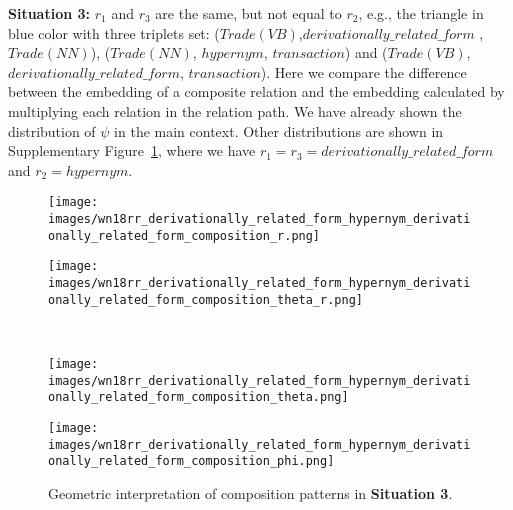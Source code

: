 \documentclass[11pt]{article}
\begin{document}
\textbf{Situation 3:} \(r_1\) and \(r_3\) are the same, but not equal to \(r_2\), e.g., the triangle in blue color with three triplets set: (\(Trade(VB)\),\(derivationally\_related\_form\)
, \(Trade(NN)\)), (\(Trade(NN)\), \(hypernym\), \(transaction\)) and (\(Trade(VB)\), \(derivationally\_related\_form\), \(transaction\)). Here we compare the difference between the embedding of a composite relation and the embedding calculated by multiplying each relation in the relation path. We have already shown the distribution of \(\psi\) in the main context. Other distributions are shown in Supplementary Figure~\ref{101}, where we have \(r_1=r_3=derivationally\_related\_form\) and \(r_2=hypernym\).

\begin{figure}[htbp]
\centering
\begin{minipage}{3.5cm}
\centering
\texttt{[image: images/wn18rr\_derivationally\_related\_form\_hypernym\_derivationally\_related\_form\_composition\_r.png]}
\end{minipage}
\begin{minipage}{3.5cm}
\centering
\texttt{[image: images/wn18rr\_derivationally\_related\_form\_hypernym\_derivationally\_related\_form\_composition\_theta\_r.png]}
\end{minipage}
\\
\begin{minipage}{3.5cm}
\centering
\texttt{[image: images/wn18rr\_derivationally\_related\_form\_hypernym\_derivationally\_related\_form\_composition\_theta.png]}
\end{minipage}
\begin{minipage}{3.5cm}
\centering
\texttt{[image: images/wn18rr\_derivationally\_related\_form\_hypernym\_derivationally\_related\_form\_composition\_phi.png]}
\end{minipage}
\caption{Geometric interpretation of composition patterns in \textbf{Situation 3}.}
\label{101}
\end{figure}
\end{document}
